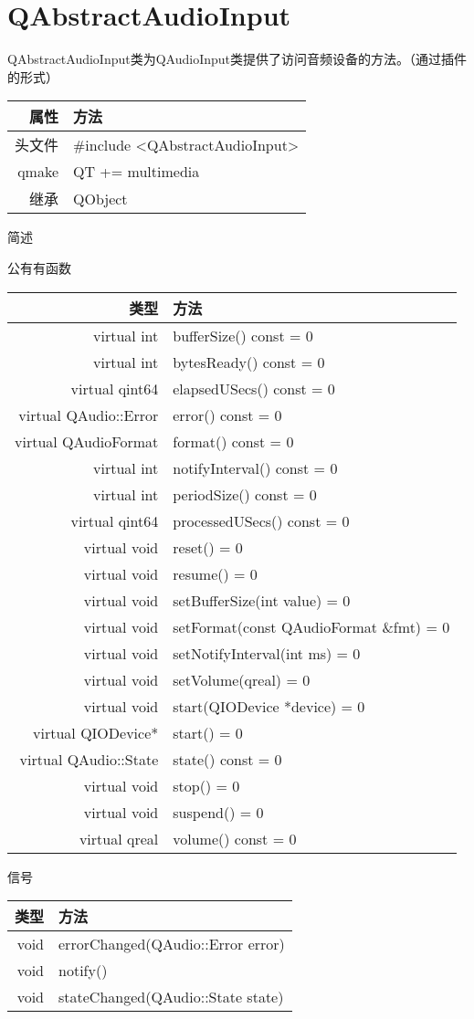 \chapter{QAbstractAudioInput}

QAbstractAudioInput类为QAudioInput类提供了访问音频设备的方法。（通过插件的形式）

\begin{tabular}{|r|l|}
	\hline
	属性 & 方法 \\
	\hline
	头文件 & \#include <QAbstractAudioInput>\\      
	\hline
	qmake &QT += multimedia\\      
	\hline
	继承&QObject \\
	\hline
\end{tabular}

简述

公有有函数

\begin{tabular}{|r|l|}
  \hline
  类型&方法\\
  \hline
  virtual int	&bufferSize() const = 0\\
  \hline
  virtual int	&bytesReady() const = 0 \\
 \hline
  virtual qint64	&elapsedUSecs() const = 0\\
  \hline
  virtual QAudio::Error&	error() const = 0\\
  \hline
virtual QAudioFormat&	format() const = 0\\
\hline
  virtual int&	notifyInterval() const = 0\\
\hline
  virtual int&	periodSize() const = 0\\
\hline
  virtual qint64&	processedUSecs() const = 0\\
  \hline
  virtual void	&reset() = 0\\
  \hline
  virtual void&	resume() = 0\\
  \hline
  virtual void	&setBufferSize(int value) = 0\\
  \hline
  virtual void	&setFormat(const QAudioFormat \&fmt) = 0 \\
  \hline
  virtual void	&setNotifyInterval(int ms) = 0\\
  \hline
  virtual void	&setVolume(qreal) = 0\\
  \hline
  virtual void	&start(QIODevice *device) = 0\\
  \hline
  virtual QIODevice*	&start() = 0\\
  \hline
  virtual QAudio::State	&state() const = 0\\
  \hline
virtual void	&stop() = 0\\
\hline
  virtual void	&suspend() = 0\\
  \hline
virtual qreal	&volume() const = 0\\
  \hline
\end{tabular}

信号

\begin{tabular}{|r|l|}
	\hline
	类型 & 方法 \\
	\hline
	void & errorChanged(QAudio::Error error)\\      
	\hline
	void & notify()\\
	\hline
	void & stateChanged(QAudio::State state)\\      
        \hline
\end{tabular}

